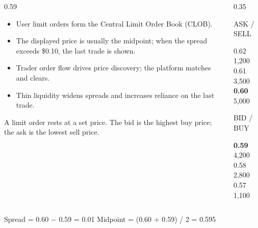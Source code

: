 \begin{frame}[t]
\begin{pmbody}
\begin{columns}[T,onlytextwidth]
\begin{column}{0.59\textwidth}
\begin{itemize}
  \item User limit orders form the Central Limit Order Book (CLOB).
  \item The displayed price is usually the midpoint; when the spread exceeds \$0.10, the last trade is shown.
  \item Trader order flow drives price discovery; the platform matches and clears.
  \item Thin liquidity widens spreads and increases reliance on the last trade.
\end{itemize}
\vspace{12pt}
{\color{pmGrey}\fontsize{15}{21}\selectfont A limit order rests at a set price. The bid is the highest buy price; the ask is the lowest sell price.\par}
\end{column}
\begin{column}{0.35\textwidth}
{\fontsize{18}{24}\selectfont
\begin{pmkey}\textcolor{pmRed}{ASK / SELL}\end{pmkey}
0.62 \hfill 1,200\\
0.61 \hfill 3,500\\
\textbf{0.60} \hfill 5,000
\begin{pmkey}\textcolor{pmGreen}{BID / BUY}\end{pmkey}
\textbf{0.59} \hfill 4,200\\
0.58 \hfill 2,800\\
0.57 \hfill 1,100\par}
\end{column}
\end{columns}
\vspace{10pt}
\begin{pmcallout}
Spread = 0.60 $-$ 0.59 = 0.01 \qquad Midpoint = (0.60 + 0.59) / 2 = 0.595
\end{pmcallout}
\end{pmbody}
\end{frame}

